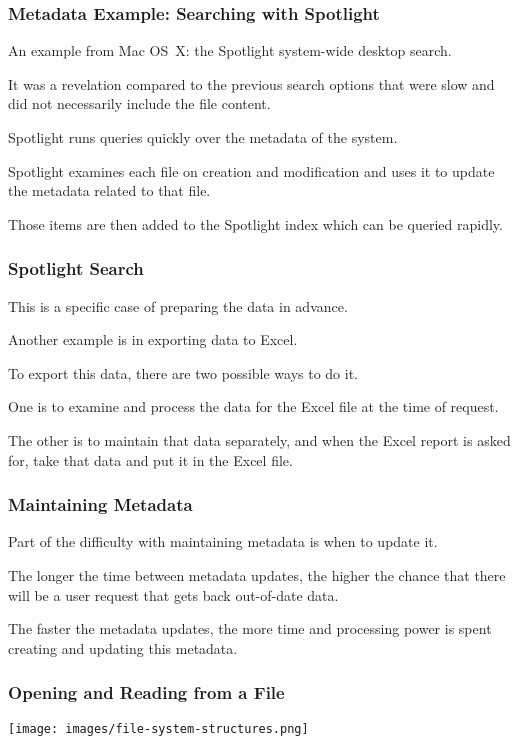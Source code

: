 \begin{frame}
\frametitle{Metadata Example: Searching with Spotlight}

An example from Mac OS~X: the Spotlight system-wide desktop search. 

It was a revelation compared to the previous search options that were slow and did not necessarily include the file content.

Spotlight runs queries quickly over the metadata of the system. 

Spotlight examines each file on creation and modification and uses it to update the metadata related to that file. 

Those items are then added to the Spotlight index which can be queried rapidly.

\end{frame}

\begin{frame}
\frametitle{Spotlight Search}

This is a specific case of preparing the data in advance. 

Another example is in exporting data to Excel. 

To export this data, there are two possible ways to do it.

One is to examine and process the data for the Excel file at the time of request. 

The other is to maintain that data separately, and when the Excel report is asked for, take that data and put it in the Excel file.


\end{frame}

\begin{frame}
\frametitle{Maintaining Metadata}

Part of the difficulty with maintaining metadata is when to update it. 

The longer the time between metadata updates, the higher the chance that there will be a user request that gets back out-of-date data. 

The faster the metadata updates, the more time and processing power is spent creating and updating this metadata.


\end{frame}

\begin{frame}
\frametitle{Opening and Reading from a File}

\begin{center}
	\texttt{[image: images/file-system-structures.png]}
\end{center}


\end{frame}

